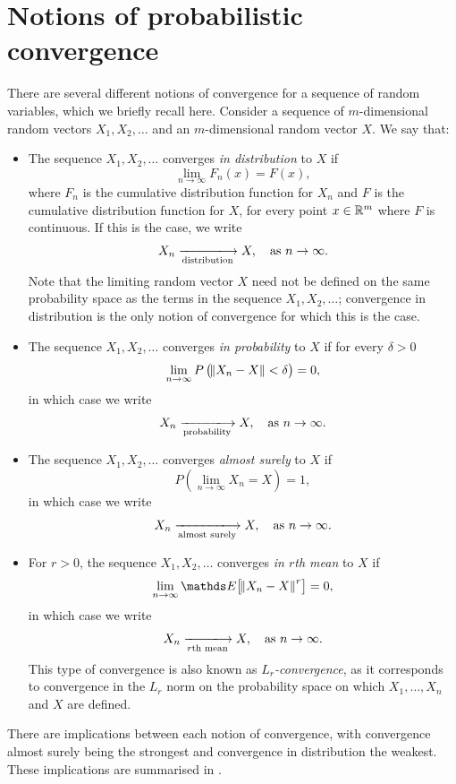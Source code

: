 \section{Notions of probabilistic convergence}
There are several different notions of convergence for a sequence of random variables, which we briefly recall here.
Consider a sequence of \(m\)-dimensional random vectors \(X_1, X_2,\dotsc\) and an \(m\)-dimensional random vector \(X\).
We say that:
\begin{itemize}
	\item The sequence \(X_1, X_2, \dotsc\) converges \emph{in distribution} to \(X\) if
	      \[
		      \lim_{n\to\infty}F_n\left(x\right) = F(x),
	      \]
	      where \(F_n\) is the cumulative distribution function for \(X_n\) and \(F\) is the cumulative distribution function for \(X\), for every point \(x \in \mathbb{R}^m\) where \(F\) is continuous.
	      If this is the case, we write
	      \[
		      X_n \xlongrightarrow[\text{distribution}]{} X, \quad \text{as } n \to \infty.
	      \]
	      Note that the limiting random vector \(X\) need not be defined on the same probability space as the terms in the sequence \(X_1, X_2, \dotsc\); convergence in distribution is the only notion of convergence for which this is the case.


	\item The sequence \(X_1, X_2, \dotsc\) converges \emph{in probability} to \(X\) if for every \(\delta > 0\)
	      \[
		      \lim_{n\to\infty}P\left(\norm{X_n - X} < \delta\right) = 0,
	      \]
	      in which case we write
	      \[
		      X_n \xlongrightarrow[\text{probability}]{} X, \quad \text{as } n \to \infty.
	      \]

	\item The sequence \(X_1, X_2, \dotsc\) converges \emph{almost surely} to \(X\) if
	      \[
		      P\left(\lim_{n \to \infty}X_n = X\right) = 1,
	      \]
	      in which case we write
	      \[
		      X_n \xlongrightarrow[\text{almost surely}]{} X, \quad \text{as } n \to \infty.
	      \]

	\item For \(r > 0\), the sequence \(X_1, X_2, \dotsc\) converges \emph{in \(r\)th mean} to \(X\) if
	      \[
		      \lim_{n\to\infty}{\avg{\norm{X_n - X}^r}} = 0,
	      \]
	      in which case we write
	      \[
		      X_n \xlongrightarrow[r\text{th mean}]{} X, \quad \text{as } n \to \infty.
	      \]
	      This type of convergence is also known as \emph{\(L_r\)-convergence}, as it corresponds to convergence in the \(L_r\) norm on the probability space on which \(X_1,\dotsc, X_n\) and \(X\) are defined.

\end{itemize}
There are implications between each notion of convergence, with convergence almost surely being the strongest and convergence in distribution the weakest.
These implications are summarised in .

